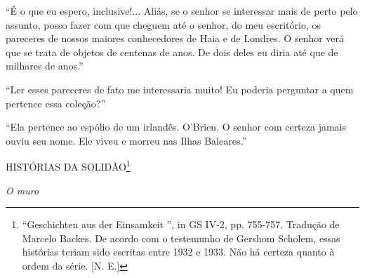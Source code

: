 ``É o que eu espero, inclusive!... Aliás, se o senhor se interessar mais
de perto pelo assunto, posso fazer com que cheguem até o senhor, do meu
escritório, os pareceres de nossos maiores conhecedores de Haia e de
Londres. O senhor verá que se trata de objetos de centenas de anos. De
dois deles eu diria até que de milhares de anos.''

``Ler esses pareceres de fato me interessaria muito! Eu poderia
perguntar a quem pertence essa coleção?''

``Ela pertence ao espólio de um irlandês. O'Brien. O senhor com certeza
jamais ouviu seu nome. Ele viveu e morreu nas Ilhas Baleares.''

HISTÓRIAS DA SOLIDÃO\footnote{``Geschichten aus der Einsamkeit '', in GS
  IV-2, pp. 755-757. Tradução de Marcelo Backes. De acordo com o
  testemunho de Gershom Scholem, essas histórias teriam sido escritas
  entre 1932 e 1933. Não há certeza quanto à ordem da série. {[}N. E.{]}}

\emph{O muro}

